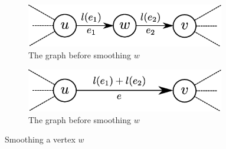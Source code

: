\begin{figure}[htbp]
    \centering
    \begin{subfigure}[htbp]{0.45\textwidth}
        \centering
        \includegraphics[width=0.95\textwidth]{Content/Pictures/smoothing1.eps}
        \caption{The graph before smoothing $w$}
    \end{subfigure}
    \hfill
    \begin{subfigure}[htbp]{0.45\textwidth}
        \centering
        \includegraphics[width=0.95\textwidth]{Content/Pictures/smoothing2.eps}
        \caption{The graph before smoothing $w$}
    \end{subfigure}
    \caption{Smoothing a vertex $w$}
    \label{fig:smoothing}
\end{figure}

